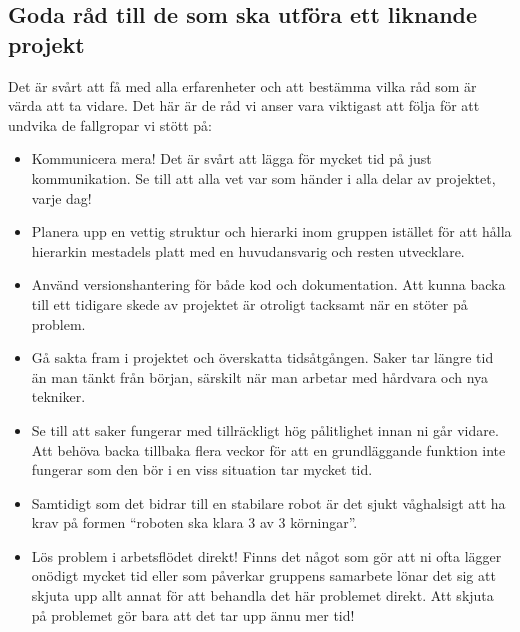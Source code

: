 \documentclass{article}
\begin{document}
\subsection{Goda råd till de som ska utföra ett liknande projekt}
Det är svårt att få med alla erfarenheter och att bestämma vilka råd som är värda att ta vidare. Det här är de råd vi anser vara viktigast att följa för att undvika de fallgropar vi stött på:

\begin{itemize}
    \item Kommunicera mera! Det är svårt att lägga för mycket tid på just kommunikation. Se till att alla vet var som händer i alla delar av projektet, varje dag!
    \item Planera upp en vettig struktur och hierarki inom gruppen istället för att hålla hierarkin mestadels platt med en huvudansvarig och resten utvecklare.
    \item Använd versionshantering för både kod och dokumentation. Att kunna backa till ett tidigare skede av projektet är otroligt tacksamt när en stöter på problem.
    \item Gå sakta fram i projektet och överskatta tidsåtgången. Saker tar längre tid än man tänkt från början, särskilt när man arbetar med hårdvara och nya tekniker.
    \item Se till att saker fungerar med tillräckligt hög pålitlighet innan ni går vidare. Att behöva backa tillbaka flera veckor för att en grundläggande funktion inte fungerar som den bör i en viss situation tar mycket tid.
    \item Samtidigt som det bidrar till en stabilare robot är det sjukt våghalsigt att ha krav på formen ``roboten ska klara 3 av 3 körningar''.
    \item Lös problem i arbetsflödet direkt! Finns det något som gör att ni ofta lägger onödigt mycket tid eller som påverkar gruppens samarbete lönar det sig att skjuta upp allt annat för att behandla det här problemet direkt. Att skjuta på problemet gör bara att det tar upp ännu mer tid!
\end{itemize}

\nocite{*}
{}

\end{document}

